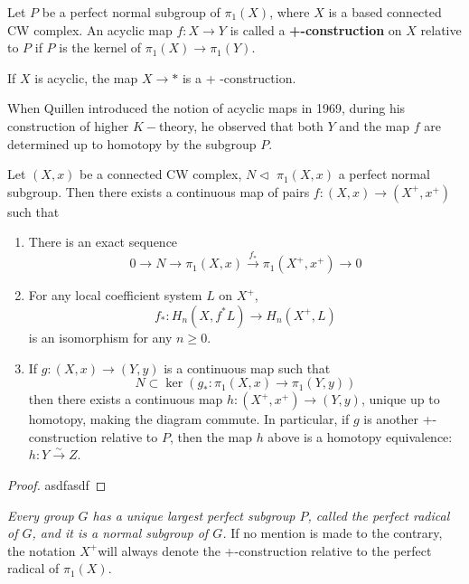 Let $P$ be a perfect normal subgroup of $\pi_1(X)$, where $X$ is a based connected CW complex. An acyclic map $f: X \rightarrow Y$ is called a \textbf{+-construction} on $X$ relative to $P$ if $P$ is the kernel of $\pi_1(X) \rightarrow \pi_1(Y)$.
\begin{lemm}
 If $X$ is acyclic, the map $X \rightarrow *$ is a + -construction.   
\end{lemm}

When Quillen introduced the notion of acyclic maps in 1969, during his construction of higher $K-$theory, he observed that both $Y$ and the map $f$ are determined up to homotopy by the subgroup $P$.

\begin{theo}[Quillen]
Let $(X, x)$ be a connected CW complex, $N \triangleleft$ $\pi_1(X, x)$ a perfect normal subgroup. Then there exists a continuous map of pairs $f:(X, x) \longrightarrow\left(X^{+}, x^{+}\right)$ such that
\begin{enumerate}
    \item There is an exact sequence
    $$
    0 \longrightarrow N \longrightarrow \pi_1(X, x) \xrightarrow{f_*} \pi_1\left(X^{+}, x^{+}\right) \longrightarrow 0
    $$
    \item For any local coefficient system $L$ on $X^{+}$,
    $$
    f_*: H_n\left(X, f^* L\right) \longrightarrow H_n\left(X^{+}, L\right)
    $$
    is an isomorphism for any $n \geq 0$.
    \item If $g:(X, x) \longrightarrow(Y, y)$ is a continuous map such that
    $$
    N \subset \operatorname{ker}\left(g_*: \pi_1(X, x) \longrightarrow \pi_1(Y, y)\right)
    $$
    then there exists a continuous map $h:\left(X^{+}, x^{+}\right) \longrightarrow(Y, y)$, unique up to homotopy, making the diagram commute.
    In particular, if $g$ is another +-construction relative to $P$, then the map $h$ above is a homotopy equivalence: $h: Y \xrightarrow{\sim} Z$.
\end{enumerate}
\end{theo}
\begin{proof}
    asdfasdf
\end{proof}

\textit{Every group $G$ has a unique largest perfect subgroup $P$, called the perfect radical of $G$, and it is a normal subgroup of $G$. }If no mention is made to the contrary, the notation $X^{+}$will always denote the +-construction relative to the perfect radical of $\pi_1(X)$.

